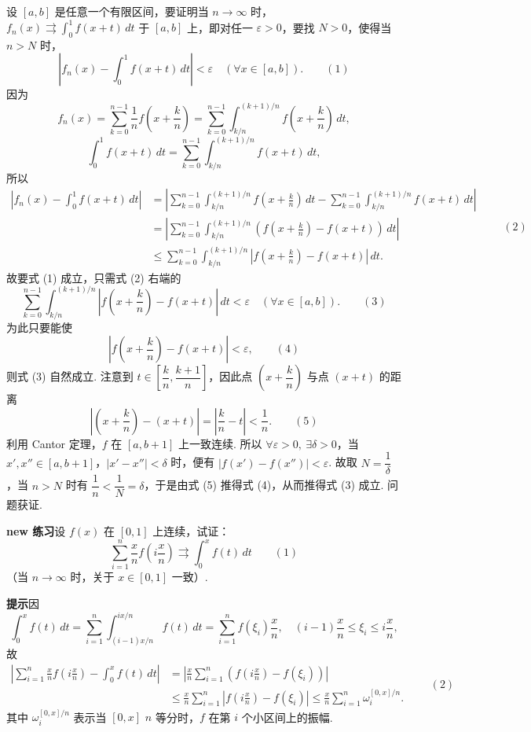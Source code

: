 \documentclass[UTF8, 12pt, fontset=fandol, oneside]{ctexart}
\begin{document}
设 $[a,b]$ 是任意一个有限区间，要证明当 $n\to\infty$ 时，
$f_n(x)\rightrightarrows\displaystyle\int_0^1f(x+t)\,dt$ 于 $[a,b]$ 上，即对任一
$\varepsilon>0$，要找 $N>0$，使得当 $n>N$ 时，
\[
  \left|f_n(x)-\int_0^1f(x+t)\,dt\right|<\varepsilon\quad(\forall x\in[a,b]).
\qquad(1)
\]
因为
\[
  f_n(x)=\sum_{k=0}^{n-1}\frac1n f\left(x+\frac{k}{n}\right)
  =\sum_{k=0}^{n-1}\int_{k/n}^{(k+1)/n}f\left(x+\frac{k}{n}\right)\,dt,
\]
\[
  \int_0^1f(x+t)\,dt
  =\sum_{k=0}^{n-1}\int_{k/n}^{(k+1)/n}f(x+t)\,dt,
\]
所以
\begin{equation}
\begin{aligned}
\left|f_n(x)-\int_0^1f(x+t)\,dt\right|
&=\left|\sum_{k=0}^{n-1}\int_{k/n}^{(k+1)/n}f\left(x+\frac{k}{n}\right)\,dt
 -\sum_{k=0}^{n-1}\int_{k/n}^{(k+1)/n}f(x+t)\,dt\right|\\
&=\left|\sum_{k=0}^{n-1}\int_{k/n}^{(k+1)/n}
\left(f\left(x+\frac{k}{n}\right)-f(x+t)\right)\,dt\right|\\
&\le\sum_{k=0}^{n-1}\int_{k/n}^{(k+1)/n}
\left|f\left(x+\frac{k}{n}\right)-f(x+t)\right|\,dt.
\end{aligned}
\qquad(2)
\end{equation}
故要式 (1) 成立，只需式 (2) 右端的
\[
  \sum_{k=0}^{n-1}\int_{k/n}^{(k+1)/n}
  \left|f\left(x+\frac{k}{n}\right)-f(x+t)\right|\,dt<\varepsilon
  \quad(\forall x\in[a,b]).
\qquad(3)
\]
为此只要能使
\[
  \left|f\left(x+\frac{k}{n}\right)-f(x+t)\right|<\varepsilon,
\qquad(4)
\]
则式 (3) 自然成立. 注意到 $t\in\left[\dfrac{k}{n},\dfrac{k+1}{n}\right]$，因此点
$\left(x+\dfrac{k}{n}\right)$ 与点 $(x+t)$ 的距离
\[
  \left|\left(x+\frac{k}{n}\right)-(x+t)\right|
  =\left|\frac{k}{n}-t\right|<\frac1n.
\qquad(5)
\]
利用 Cantor 定理，$f$ 在 $[a,b+1]$ 上一致连续. 所以 $\forall\varepsilon>0,\ \exists\delta>0$，当
$x',x''\in[a,b+1]$，$|x'-x''|<\delta$ 时，便有
$|f(x')-f(x'')|<\varepsilon$. 故取 $N=\dfrac1\delta$，当 $n>N$ 时有
$\dfrac1n<\dfrac1N=\delta$，于是由式 (5) 推得式 (4)，从而推得式 (3) 成立. 问题获证.

\noindent\textbf{new 练习}\quad 设 $f(x)$ 在 $[0,1]$ 上连续，试证：
\[
  \sum_{i=1}^n\frac{x}{n}f\left(i\frac{x}{n}\right)\rightrightarrows\int_0^xf(t)\,dt
\qquad(1)
\]
（当 $n\to\infty$ 时，关于 $x\in[0,1]$ 一致）.

\noindent\textbf{提示}\quad 因
\[
  \int_0^xf(t)\,dt=\sum_{i=1}^n\int_{(i-1)x/n}^{ix/n}f(t)\,dt
  =\sum_{i=1}^n f(\xi_i)\frac{x}{n},\quad (i-1)\frac{x}{n}\le\xi_i\le i\frac{x}{n},
\]
故
\begin{equation}
\begin{aligned}
\left|\sum_{i=1}^n\frac{x}{n}f\left(i\frac{x}{n}\right)-\int_0^xf(t)\,dt\right|
&=\left|\frac{x}{n}\sum_{i=1}^n\left(f\left(i\frac{x}{n}\right)-f(\xi_i)\right)\right|\\
&\le\frac{x}{n}\sum_{i=1}^n\left|f\left(i\frac{x}{n}\right)-f(\xi_i)\right|
\le \frac{x}{n}\sum_{i=1}^n\omega_i^{[0,x]/n}.
\end{aligned}
\qquad(2)
\end{equation}
其中 $\omega_i^{[0,x]/n}$ 表示当 $[0,x]$ $n$ 等分时，$f$ 在第 $i$ 个小区间上的振幅.
\end{document}
